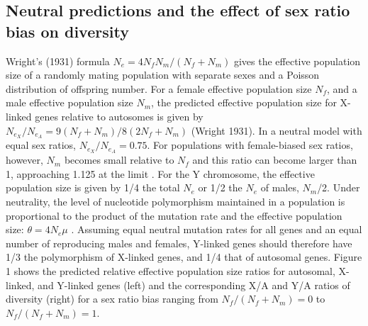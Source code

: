 \documentclass[9pt,twocolumn,twoside]{gsajnl}
\begin{document}
\subsection*{Neutral predictions and the effect of sex ratio bias on diversity}
Wright's (1931) formula $N_{e}=4N_{f}N_{m}/(N_{f} + N_{m})$ gives the effective population size of a randomly mating population with separate sexes and a Poisson distribution of offspring number. For a female effective population size $N_{f}$, and a male effective population size $N_{m}$, the predicted effective population size for X-linked genes relative to autosomes is given by $N_{e_{X}}/N_{e_{A}} = 9(N_{f}+N_{m})/8(2N_{f}+N_{m})$ (Wright 1931). In a neutral model with equal sex ratios, $N_{e_{X}}/N_{e_{A}} = 0.75$. For populations with female-biased sex ratios, however, $N_{m}$ becomes small relative to $N_{f}$ and this ratio can become larger than 1, approaching 1.125 at the limit \citep{caballero1995}. For the Y chromosome, the effective population size is given by 1/4 the total $N_{e}$ or 1/2 the $N_{e}$ of males, $N_{m}$/2. Under neutrality, the level of nucleotide polymorphism maintained in a population is proportional to the product of the mutation rate and the effective population size: $\theta=4N_{e}\mu$ \citep{watterson1975,kimura1984}. Assuming equal neutral mutation rates for all genes and an equal number of reproducing males and females, Y-linked genes should therefore have 1/3 the polymorphism of X-linked genes, and 1/4 that of autosomal genes. Figure 1 shows the predicted relative effective population size ratios for autosomal, X-linked, and Y-linked genes (left) and the corresponding X/A and Y/A ratios of diversity (right) for a sex ratio bias ranging from $N_{f}/(N_{f}+N_{m})=0$ to $N_{f}/(N_{f}+N_{m})=1$.
\end{document}
